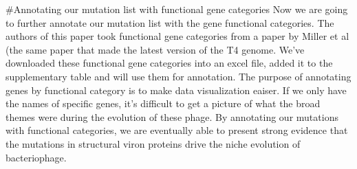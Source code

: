 \documentclass[
]{article}
\begin{document}
\#Annotating our mutation list with functional gene categories Now we
are going to further annotate our mutation list with the gene functional
categories. The authors of this paper took functional gene categories
from a paper by Miller et al (the same paper that made the latest
version of the T4 genome. We've downloaded these functional gene
categories into an excel file, added it to the supplementary table and
will use them for annotation. The purpose of annotating genes by
functional category is to make data visualization eaiser. If we only
have the names of specific genes, it's difficult to get a picture of
what the broad themes were during the evolution of these phage. By
annotating our mutations with functional categories, we are eventually
able to present strong evidence that the mutations in structural viron
proteins drive the niche evolution of bacteriophage.
\end{document}
